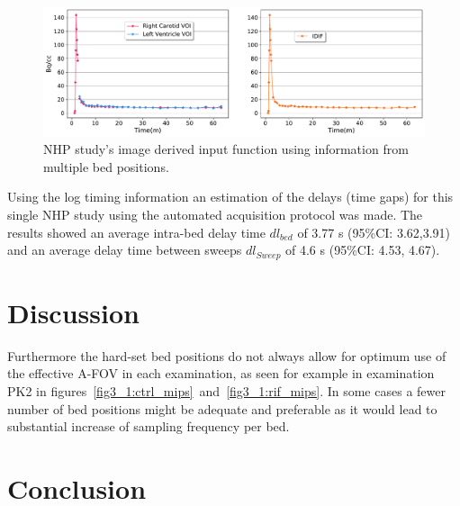 %
%
\begin{figure} [ht!]
\centering
\includegraphics[scale=0.45,angle=0]{3_Results/3_1_DWB_Optimization/figures/3_1_NHP_InputFunction.pdf}
\caption{NHP study's image derived input function using information from multiple bed positions.}
\label{fig3_1:Macaque_PET}
\end{figure}
%
Using the log timing information an estimation of the delays (time gaps) for this single NHP study using the automated acquisition protocol was made. The results showed an average intra-bed delay time $dl_{bed}$ of 3.77 s (95\%CI: 3.62,3.91) and an average delay time between sweeps $dl_{Sweep}$ of 4.6 s (95\%CI: 4.53, 4.67).


\section{Discussion}

Furthermore the hard-set bed positions do not always allow for optimum use of the effective A-FOV in each examination, as seen for example in examination PK2 in figures~\ref{fig3_1:ctrl_mips}~and~\ref{fig3_1:rif_mips}. In some cases a fewer number of bed positions might be adequate and preferable as it would lead to substantial increase of sampling frequency per bed. \\




\section{Conclusion}



